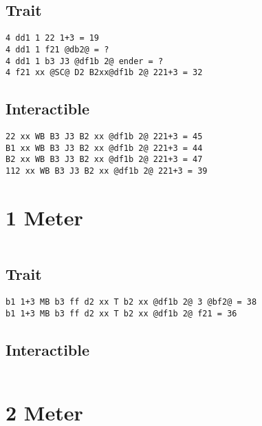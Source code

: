 \documentclass[main.tex]{subfiles}
\begin{document}
\subsection{Trait}

\begin{lstlisting}[language=FG]
4 dd1 1 22 1+3 = 19
4 dd1 1 f21 @db2@ = ?
4 dd1 1 b3 J3 @df1b 2@ ender = ?
4 f21 xx @SC@ D2 B2xx@df1b 2@ 221+3 = 32
\end{lstlisting}


\subsection{Interactible}
\begin{lstlisting}[language=FG]
22 xx WB B3 J3 B2 xx @df1b 2@ 221+3 = 45
B1 xx WB B3 J3 B2 xx @df1b 2@ 221+3 = 44
B2 xx WB B3 J3 B2 xx @df1b 2@ 221+3 = 47
112 xx WB B3 J3 B2 xx @df1b 2@ 221+3 = 39
\end{lstlisting}

\section{1 Meter}


\begin{lstlisting}[language=FG]
\end{lstlisting}

\subsection{Trait}
\begin{lstlisting}[language=FG]
b1 1+3 MB b3 ff d2 xx T b2 xx @df1b 2@ 3 @bf2@ = 38
b1 1+3 MB b3 ff d2 xx T b2 xx @df1b 2@ f21 = 36 
\end{lstlisting}


\subsection{Interactible}
\begin{lstlisting}[language=FG]

\end{lstlisting}

\section{2 Meter}


\begin{lstlisting}[language=FG]
\end{lstlisting}
\end{document}
